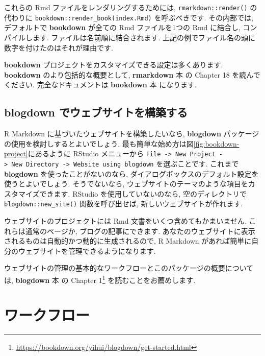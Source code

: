 \documentclass[
  11pt,
  lualatex,ja=standard,jafont=noto]{bxjsreport}
\renewcommand{\href}[2]{#2\footnote{\url{#1}}}
\begin{document}
これらの Rmd ファイルをレンダリングするためには, \texttt{rmarkdown::render()} の代わりに \texttt{bookdown::render\_book(\textquotesingle{}index.Rmd\textquotesingle{})} を呼ぶべきです. その内部では, デフォルトで \textbf{bookdown} が全ての Rmd ファイルを1つの Rmd に結合し, コンパイルします. ファイルは名前順に結合されます. 上記の例でファイル名の頭に数字を付けたのはそれが理由です.

\textbf{bookdown} プロジェクトをカスタマイズできる設定は多くあります. \textbf{bookdown} のより包括的な概要として, \textbf{rmarkdown} 本 \autocite{rmarkdown2018} の Chapter 18 を読んでください. 完全なドキュメントは \textbf{bookdown} 本 \autocite{bookdown2016} になります.

\hypertarget{blogdown}{%
\section{\texorpdfstring{\textbf{blogdown} でウェブサイトを構築する}{blogdown でウェブサイトを構築する}}\label{blogdown}}

R Markdown に基づいたウェブサイトを構築したいなら, \textbf{blogdown} パッケージ \autocite{R-blogdown} の使用を検討しするとよいでしょう. 最も簡単な始め方は図\ref{fig:bookdown-project}にあるように RStudio メニューから \texttt{File -\textgreater{}\ New\ Project\ -\textgreater{}\ New\ Directory\ -\textgreater{}\ Website\ using\ blogdown} を選ぶことです. これまで \textbf{blogdown} を使ったことがないのなら, ダイアログボックスのデフォルト設定を使うとよいでしょう. そうでないなら, ウェブサイトのテーマのような項目をカスタマイズできます. RStudio を使用していないのなら, 空のディレクトリで \texttt{blogdown::new\_site()} 関数を呼び出せば, 新しいウェブサイトが作れます.

ウェブサイトのプロジェクトには Rmd 文書をいくつ含めてもかまいません. これらは通常のページか, ブログの記事にできます. あなたのウェブサイトに表示されるものは自動的かつ動的に生成されるので, R Markdown があれば簡単に自分のウェブサイトを管理できるようになります.

ウェブサイトの管理の基本的なワークフローとこのパッケージの概要については, \textbf{blogdown} 本 \autocite{blogdown2017} の \href{https://bookdown.org/yihui/blogdown/get-started.html}{Chapter 1} を読むことをお薦めします.

\hypertarget{workflow}{%
\chapter{ワークフロー}\label{workflow}}
\end{document}
